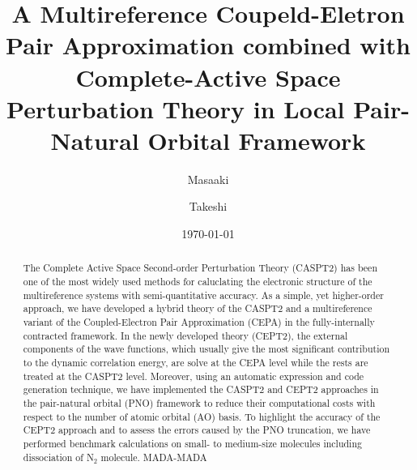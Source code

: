 \documentclass[aip,jcp,amsmath]{revtex4-1}
\begin{document}
\title{\color{blue}
  A Multireference Coupeld-Eletron Pair Approximation combined with Complete-Active Space Perturbation Theory in Local Pair-Natural Orbital Framework}
\date{\today}
\author{Masaaki }

\author{Takeshi }

\begin{abstract}  
  The Complete Active Space Second-order Perturbation Theory (CASPT2) has been one of the most widely used methods for caluclating the electronic structure of the multireference systems with semi-quantitative accuracy.
  As a simple, yet higher-order approach, we have developed a hybrid theory of the CASPT2 and a multireference variant of the Coupled-Electron Pair Approximation (CEPA) in the fully-internally contracted framework.
  In the newly developed theory (CEPT2), the external components of the wave functions, which usually give the most significant contribution to the dynamic correlation energy, are solve at the CEPA level while the rests are treated at the CASPT2 level.
  Moreover, using an automatic expression and code generation technique, we have implemented the CASPT2 and CEPT2 approaches in the pair-natural orbital (PNO) framework to reduce their computational costs with respect to the number of atomic orbital (AO) basis.
  To highlight the accuracy of the CEPT2 approach and to assess the errors caused by the PNO truncation, we have performed benchmark calculations on small- to medium-size molecules including dissociation of N${}_2$ molecule.
  MADA-MADA
  
\end{abstract}

\maketitle
\end{document}
